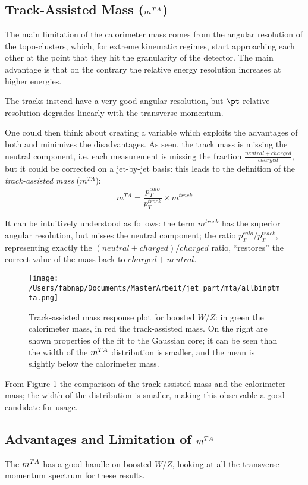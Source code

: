 
\subsection{Track-Assisted Mass ($\mta$)}
The main limitation of the calorimeter mass comes from the angular resolution of the topo-clusters, which, for extreme kinematic regimes, start approaching each other at the point that they hit the granularity of the detector. The main advantage is that on the contrary the relative energy resolution increases at higher energies.

The tracks instead have a very good angular resolution, but $\pt$ relative resolution degrades linearly with the transverse momentum. 

One could then think about creating a variable which exploits the advantages of both and minimizes the disadvantages. As seen, the track mass is missing the neutral component, i.e. each measurement is missing the fraction $\frac{neutral+charged}{charged}$, but it could be corrected on a jet-by-jet basis: this leads to the definition of the \textit{track-assisted mass} ($m^{TA}$):
\begin{equation}
 m^{TA}=\frac{p_T^{calo}}{p_T^{track}}\times m^{track}
\end{equation}

It can be intuitively understood as follows: the term $m^{track}$ has the superior angular resolution, but misses the neutral component; the ratio $p_T^{calo}/p_T^{track}$, representing exactly the $(neutral+charged)/charged$ ratio, ``restores'' the correct value of the mass back to $charged+neutral$.
\begin{figure}[!ht]
  \centering
      \texttt{[image: /Users/fabnap/Documents/MasterArbeit/jet\_part/mta/allbinptmta.png]}
  \caption[$\mcal$ and $\mta$ mass responses]{Track-assisted mass response plot for boosted $W/Z$: in green the calorimeter mass, in red the track-assisted mass. On the right are shown properties of the fit to the Gaussian core; it can be seen than the width of the $\mta$ distribution is smaller, and the mean is slightly below the calorimeter mass.}
  \label{fig:mta1}
\end{figure}

From Figure \ref{fig:mta1} the comparison of the track-assisted mass and the calorimeter mass; the width of the distribution is smaller, making this observable a good candidate for usage.


\subsection{Advantages and Limitation of $\mta$}
The $\mta$ has a good handle on boosted $W/Z$, looking at all the transverse momentum spectrum for these results.

